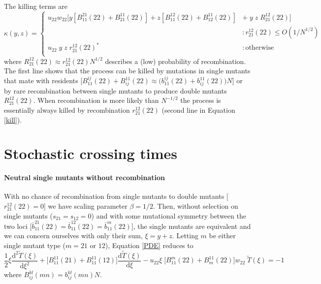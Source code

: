 \documentclass[review,3p,authoryear]{elsarticle}
\begin{document}
\begin{appendices}
The killing terms are
\begin{equation}\label{kill}
 \kappa (y,z) = \left\{
     \begin{array}{ll}
     u_{22} w_{22} \Big[ y [ B_{11}^{21}(22) + B_{21}^{11}(22) ] + z [ B_{11}^{12}(22) + B_{12}^{11}(22) ]&+ \; y \; z \; R_{21}^{12}(22) \Big] \\ &: r_{21}^{12}(22) \leq O(1/N^{1/2})  \\
      u_{22} \; y \; z \; r_{21}^{12}(22)^* & : \mathrm{otherwise} \\
      \end{array}
   \right.
\end{equation} 
where $R_{21}^{12}(22) \approx r_{21}^{12}(22) N^{{1/2}}$ describes a (low) probability of recombination.
The first line shows that the process can be killed by mutations in single mutants that mate with residents [$B_{11}^{ij}(22) + B_{ij}^{11}(22) \approx \big(b_{11}^{ij}(22) + b_{ij}^{11}(22)\big)N$] or by rare recombination between single mutants to produce double mutants $R_{21}^{12}(22)$.
When recombination is more likely than $N^{-1/2}$ the process is essentially always killed by recombination $r_{21}^{12}(22)$ (second line in Equation \ref{kill}).

\section{Stochastic crossing times}
\label{App:StochasticTimes}
\renewcommand{\theequation}{C\arabic{equation}}
\setcounter{equation}{0} 

\paragraph{Neutral single mutants without recombination}

With no chance of recombination from single mutants to double mutants [$r_{21}^{12}(22) = 0$] we have scaling parameter $\beta=1/2$.
Then, without selection on single mutants ($s_{21} = s_{12} = 0$) and with some mutational symmetry between the two loci [$\bar{b}_{11}^{21}(22) = \bar{b}_{11}^{12}(22) = \bar{b}_{11}^{m}(22) $], the single mutants are equivalent and we can concern ourselves with only their sum, $\xi = y + z$. 
Letting $m$ be either single mutant type ($m=21$ or $12$), Equation \eqref{PDE} reduces to
\begin{equation}\label{NoRecombDE}
\frac{1}{2} \xi \frac{\mathrm{d}^2 \tilde{T}(\xi)}{\mathrm{d} \xi^2} + \Big[B_{11}^{11}(21) + B_{11}^{11}(12)\Big] \frac{\mathrm{d} \tilde{T}(\xi)}{\mathrm{d} \xi} - u_{22} \xi \; \Big[ B_{11}^{m}(22) + B_{m}^{11}(22) \Big] w_{22} \;\tilde{T}(\xi) = -1
\end{equation}
where $B_{ij}^{kl}(mn)=b_{ij}^{kl}(mn)N$.


\end{appendices}
\end{document}

